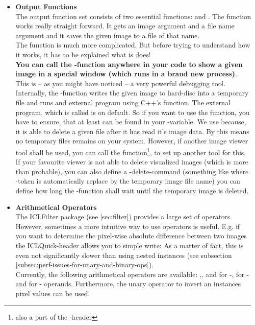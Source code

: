 \begin{itemize}
\item \textbf{Output Functions}\\
The output function set consists of two essential functions:  and . The  function works really straight forward. It gets an image argument and a file name argument and it saves the given image to a file of that name.\\
The  function is much more complicated. But before trying to understand how it works, it has to be explained what is does! \\[10pt]
\textbf{You can call the -function anywhere in your code to show a given image in a special window (which runs in a brand new process)}.\\[10pt]
This is -- as you might have noticed -- a very powerful debugging tool. Internally, the -function writes the given image to hard-disc into a temporary file and runs and external program using C++'s  function. The external program, which is called is  on default. So if you want to use the  function, you have to ensure, that at least  can be found in your -variable. We use  because, it is able to delete a given file after it has read it's image data. By this means no temporary files remains on your system. However, if another image viewer tool shall be used, you can call the  function\footnote{also a part of the -header}, to set up another tool for this. If your favourite viewer is not able to delete visualized images (which is more than probable), you can also define a -delete-command (something like  where -token is automatically replace by the temporary image file name) you can define how long the -function shall wait until the temporary image is deleted. 

\item \textbf{Arithmetical Operators}\\
The ICLFilter package (see \ref{sec:filter}) provides a large set of operators. However, sometimes a more intuitive way to use operators is useful. E.g. if you want to determine the pixel-wise absolute difference between two images the ICLQuick-header allows you to simple write:
As a matter of fact, this is even not significantly slower than using nested  instances (see subsection \ref{subsec:perf-issues-for-unary-and-binary-ops}).\\
Currently, the following arithmetical operators are available: \icode{+},\icode{-},\icode{*} and \icode{/} for -, for - and for - operands. Furthermore, the unary operator \icode{-} to invert an  instances pixel values can be used. 


\end{itemize}
